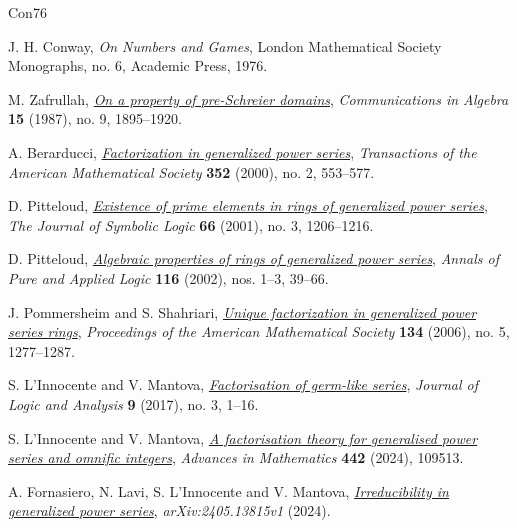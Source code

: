 \begin{thebibliography}{Con76}

J. H. Conway,
\emph{On Numbers and Games},
London Mathematical Society Monographs, no. 6, Academic Press, 1976.

M. Zafrullah,
\href{https://doi.org/10.1080/00927878708823512}{\emph{On a property of pre-Schreier domains}},
\emph{Communications in Algebra} \textbf{15} (1987), no. 9, 1895–1920.

A. Berarducci,
\href{https://doi.org/10.1090/S0002-9947-99-02172-8}{\emph{Factorization in generalized power series}},
\emph{Transactions of the American Mathematical Society} \textbf{352} (2000), no. 2, 553–577.

D. Pitteloud,
\href{https://doi.org/10.2307/2695102}{\emph{Existence of prime elements in rings of generalized power series}},
\emph{The Journal of Symbolic Logic} \textbf{66} (2001), no. 3, 1206–1216.

D. Pitteloud,
\href{https://doi.org/10.1016/S0168-0072(01)00099-9}{\emph{Algebraic properties of rings of generalized power series}},
\emph{Annals of Pure and Applied Logic} \textbf{116} (2002), nos. 1–3, 39–66.

J. Pommersheim and S. Shahriari,
\href{https://doi.org/10.1090/S0002-9939-05-08162-1}{\emph{Unique factorization in generalized power series rings}},
\emph{Proceedings of the American Mathematical Society} \textbf{134} (2006), no. 5, 1277–1287.

S. L'Innocente and V. Mantova,
\href{https://doi.org/10.4115/jla.2017.9.3}{\emph{Factorisation of germ-like series}},
\emph{Journal of Logic and Analysis} \textbf{9} (2017), no. 3, 1–16.

S. L'Innocente and V. Mantova,
\href{https://doi.org/10.1016/j.aim.2024.109513}{\emph{A factorisation theory for generalised power series and omnific integers}},
\emph{Advances in Mathematics} \textbf{442} (2024), 109513.

A. Fornasiero, N. Lavi, S. L'Innocente and V. Mantova,
\href{https://arxiv.org/abs/2405.13815}{\emph{Irreducibility in generalized power series}},
\emph{arXiv:2405.13815v1} (2024).

\end{thebibliography}

